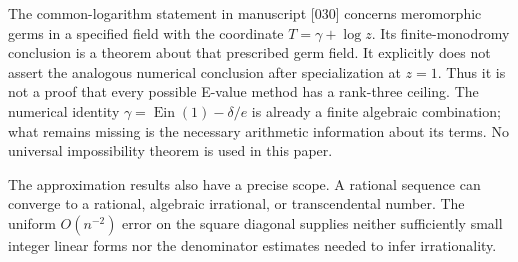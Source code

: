 \documentclass[11pt]{article}
\theoremstyle{definition}
\theoremstyle{remark}
\newcommand{\Ein}{\operatorname{Ein}}
\begin{document}
The common-logarithm statement in manuscript [030] \cite{Source030}
concerns meromorphic germs in a specified field with the coordinate
$T=\gamma+\log z$. Its finite-monodromy conclusion is a theorem about
that prescribed germ field. It explicitly does not assert the analogous
numerical conclusion after specialization at $z=1$. Thus it is not a
proof that every possible E-value method has a rank-three ceiling.
The numerical identity $\gamma=\Ein(1)-\delta/e$ is already a finite
algebraic combination; what remains missing is the necessary arithmetic
information about its terms. No universal impossibility theorem is used
in this paper.

The approximation results also have a precise scope. A rational sequence
can converge to a rational, algebraic irrational, or transcendental
number. The uniform $O(n^{-2})$ error on the square diagonal supplies
neither sufficiently small integer linear forms nor the denominator
estimates needed to infer irrationality.
\end{document}
